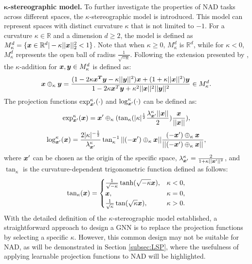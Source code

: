 {\bf $\boldsymbol{\kappa}$-stereographic model.} To further investigate the properties of NAD tasks across different spaces, the $\kappa$-stereographic model is introduced. This model can represent spaces with distinct curvature $\kappa$ that is not limited to $-1$. For a curvature $\kappa\in \mathbb{R}$ and a dimension $d\geq 2$, the model is defined as $M_\kappa^d=\{\boldsymbol{x}\in \mathbb{R}^d | -\kappa||\boldsymbol{x}||_2^2 < 1\}$. Note that when $\kappa\geq 0$, $M_\kappa^d$ is $\mathbb{R}^d$, while for $\kappa<0$, $M_\kappa^d$ represents the open ball of radius $\frac{1}{\sqrt{-\kappa}}$. Following the extension presented by \cite{kappa20bachmann}, the $\kappa$-addition for $\boldsymbol{x}, \boldsymbol{y} \in M_\kappa^d$ is defined as: 
\begin{equation*}
    \boldsymbol{x}\oplus_\kappa\boldsymbol{y}=\frac{(1-2\kappa\boldsymbol{x^T}\boldsymbol{y}-\kappa||\boldsymbol{y}||^2)\boldsymbol{x}+(1+\kappa||\boldsymbol{x}||^2)\boldsymbol{y}}{1-2\kappa\boldsymbol{x}^T\boldsymbol{y}+\kappa^2||\boldsymbol{x}||^2||\boldsymbol{y}||^2} \in M_\kappa^d. 
\end{equation*}
The projection functions $\exp_{\boldsymbol{x}'}^\kappa(\cdot)$ and $\log_{\boldsymbol{x}'}^\kappa(\cdot)$ can be defined as: 
\begin{equation}\label{eqn:exp}
    \exp_{\boldsymbol{x}'}^\kappa(\boldsymbol{x})=\boldsymbol{x}'\oplus_\kappa(\tan_\kappa(|\kappa|^\frac{1}{2}\frac{\lambda_{\boldsymbol{x}'}^\kappa||\boldsymbol{x}||}{2})\frac{\boldsymbol{x}}{||\boldsymbol{x}||}), 
\end{equation}
\begin{equation}\label{eqn:log}
    \log_{\boldsymbol{x}'}^\kappa(\boldsymbol{x})=\frac{2|\kappa|^{-\frac{1}{2}}}{\lambda_{\boldsymbol{x}'}^\kappa}\tan_\kappa^{-1}||(-\boldsymbol{x}')\oplus_\kappa\boldsymbol{x}||\frac{(-\boldsymbol{x}')\oplus_\kappa\boldsymbol{x}}{||(-\boldsymbol{x}')\oplus_\kappa\boldsymbol{x}||}, 
\end{equation}
where $\boldsymbol{x}'$ can be chosen as the origin of the specific space, $\lambda_{\boldsymbol{x}'}^\kappa = \frac{2}{1+\kappa||\boldsymbol{x}'||^2}$, and $\tan_\kappa$ is the curvature-dependent trigonometric function defined as follows: 
\begin{equation*}
\begin{aligned}
    \tan_\kappa(\boldsymbol{x})=
    \begin{cases}
    \frac{1}{\sqrt{-\kappa}}\tanh(\sqrt{-\kappa}\boldsymbol{x}), &\kappa < 0,\\
    \boldsymbol{x}, &\kappa=0,\\
    \frac{1}{\sqrt{\kappa}}\tan(\sqrt{\kappa}\boldsymbol{x}), &\kappa>0. 
    \end{cases}
\end{aligned}
\end{equation*}
With the detailed definition of the $\kappa$-stereographic model established, a straightforward approach to design a GNN is to replace the projection functions by selecting a specific $\kappa$. However, this common design may not be suitable for NAD, as will be demonstrated in Section \ref{subsec:LSP}, where the usefulness of applying learnable projection functions to NAD will be highlighted. 
